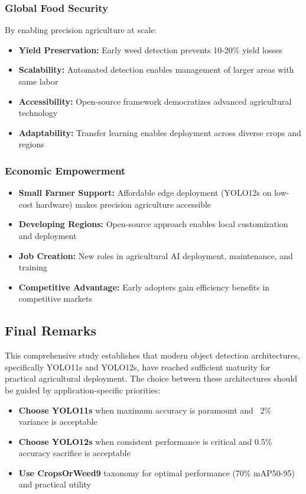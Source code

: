 \subsubsection{Global Food Security}

By enabling precision agriculture at scale:

\begin{itemize}
    \item \textbf{Yield Preservation:} Early weed detection prevents 10-20\% yield losses
    \item \textbf{Scalability:} Automated detection enables management of larger areas with same labor
    \item \textbf{Accessibility:} Open-source framework democratizes advanced agricultural technology
    \item \textbf{Adaptability:} Transfer learning enables deployment across diverse crops and regions
\end{itemize}

\subsubsection{Economic Empowerment}

\begin{itemize}
    \item \textbf{Small Farmer Support:} Affordable edge deployment (YOLO12s on low-cost hardware) makes precision agriculture accessible
    \item \textbf{Developing Regions:} Open-source approach enables local customization and deployment
    \item \textbf{Job Creation:} New roles in agricultural AI deployment, maintenance, and training
    \item \textbf{Competitive Advantage:} Early adopters gain efficiency benefits in competitive markets
\end{itemize}

\subsection{Final Remarks}

This comprehensive study establishes that modern object detection architectures, specifically YOLO11s and YOLO12s, have reached sufficient maturity for practical agricultural deployment. The choice between these architectures should be guided by application-specific priorities:

\begin{itemize}
    \item \textbf{Choose YOLO11s} when maximum accuracy is paramount and ~2\% variance is acceptable
    \item \textbf{Choose YOLO12s} when consistent performance is critical and 0.5\% accuracy sacrifice is acceptable
    \item \textbf{Use CropsOrWeed9} taxonomy for optimal performance (70\% mAP50-95) and practical utility
\end{itemize}

